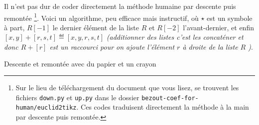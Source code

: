 Il n'est pas dur de coder directement la méthode humaine par descente puis remontée
\footnote{
	Sur le lieu de téléchargement du document que vous lisez, se trouvent les fichiers \texttt{down.py} et \texttt{up.py} dans le dossier \texttt{bezout-coef-for-human/euclid2tikz}.
	Ces codes traduisent directement la méthode à la main par descente puis remontée.
}.
Voici un algorithme, peu efficace mais instructif, où $\star$ est un symbole à part, $R[-1]$ le dernier élément de la liste $R$ et $R[-2]$ l'avant-dernier, et enfin $[x, y] + [r, s, t] \eqdef [x, y, r, s, t]$ \emph{(additionner des listes c'est les concaténer et donc $R + [r]$ est un raccourci pour \emph{\og on ajoute l'élément $r$ à droite de la liste $R$ \fg})}.


\begin{algo}
	\caption{Descente et remontée avec du papier et un crayon} \label{algo-human-paper}
	\addalgoblank
\end{algo}


